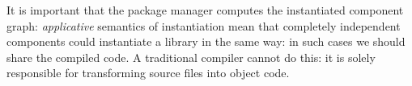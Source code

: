 It is important that the package manager computes
the instantiated component graph: \emph{applicative}
semantics of instantiation mean that completely independent
components could instantiate a library in the same way: in such
cases we should share the compiled code.  A traditional compiler cannot
do this: it is solely responsible for transforming source
files into object code.











